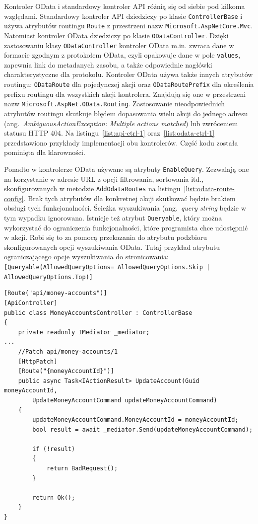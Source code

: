 Kontroler OData i standardowy kontroler API różnią się od siebie pod kilkoma względami. Standardowy kontroler API dziedziczy po klasie \texttt{ControllerBase} i używa atrybutów routingu \texttt{Route} z przestrzeni nazw \texttt{Microsoft.AspNetCore.Mvc}. Natomiast kontroler OData dziedziczy po klasie \texttt{ODataController}. Dzięki zastosowaniu klasy \texttt{ODataController} kontroler OData m.in. zwraca dane w formacie zgodnym z protokołem OData, czyli opakowuje dane w pole \texttt{values}, zapewnia link do metadanych zasobu, a także odpowiednie nagłówki charakterystyczne dla protokołu. Kontroler OData używa także innych atrybutów routingu: \texttt{ODataRoute} dla pojedynczej akcji oraz \texttt{ODataRoutePrefix} dla określenia prefixu routingu dla wszystkich akcji kontrolera. Znajdują się one w przestrzeni nazw \texttt{Microsoft.AspNet.OData.Routing}. Zastosowanie nieodpowiednich atrybutów routingu skutkuje błędem dopasowania wielu akcji do jednego adresu (ang.~\emph{AmbiguousActionException: Multiple actions matched}) lub zwróceniem statusu HTTP 404. Na listingu~\ref{list:api-ctrl-1} oraz~\ref{list:odata-ctrl-1} przedstawiono przykłady implementacji obu kontrolerów. Część kodu została pominięta dla klarowności.

Ponadto w kontrolerze OData używane są atrybuty \texttt{EnableQuery}. Zezwalają one na korzystanie w adresie URL z opcji filtrowania, sortowania itd., skonfigurowanych w metodzie \texttt{AddOdataRoutes} na listingu~\ref{list:odata-route-config}. Brak tych atrybutów dla konkretnej akcji skutkować będzie brakiem obsługi tych funkcjonalności. Ścieżka wyszukiwania (ang.~\emph{query string} będzie w tym wypadku ignorowana. Istnieje też atrybut \texttt{Queryable}, który można wykorzystać do ograniczenia funkcjonalności, które programista chce udostępnić w akcji. Robi się to za pomocą przekazania do atrybutu podzbioru skonfigurowanych opcji wyszukiwania OData. Tutaj przykład atrybutu ograniczającego opcje wyszukiwania do stronicowania: \texttt{[Queryable(AllowedQueryOptions=
    AllowedQueryOptions.Skip | AllowedQueryOptions.Top)]}

{\belowcaptionskip=-10pt
\begin{lstlisting}[label=list:api-ctrl-1,
    caption=Przykład implementacji standardowego kontrolera API]
[Route("api/money-accounts")]
[ApiController]
public class MoneyAccountsController : ControllerBase
{
    private readonly IMediator _mediator;
...
    //Patch api/money-accounts/1
    [HttpPatch]
    [Route("{moneyAccountId}")]
    public async Task<IActionResult> UpdateAccount(Guid moneyAccountId,
        UpdateMoneyAccountCommand updateMoneyAccountCommand)
    {
        updateMoneyAccountCommand.MoneyAccountId = moneyAccountId;
        bool result = await _mediator.Send(updateMoneyAccountCommand);
    
        if (!result)
        {
            return BadRequest();
        }
    
        return Ok();
    }
}
\end{lstlisting}
}

